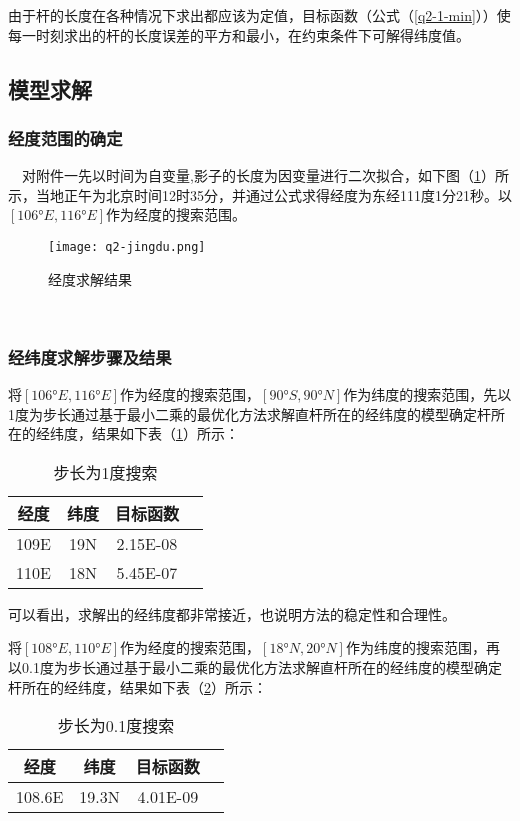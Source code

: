 \documentclass[withoutpreface,bwprint]{cumcmthesis} %
\begin{document}
\par 由于杆的长度在各种情况下求出都应该为定值，目标函数（公式（\ref{q2-1-min}））使每一时刻求出的杆的长度误差的平方和最小，在约束条件下可解得纬度值。

\subsection{模型求解}
\subsubsection{经度范围的确定}
　对附件一先以时间为自变量,影子的长度为因变量进行二次拟合，如下图（\ref{fig:q2-jingdu}）所示，当地正午为北京时间12时35分，并通过公式求得经度为东经111度1分21秒。以$[106°E, 116°E]$作为经度的搜索范围。

\begin{figure}[h]
\small
\centering
\texttt{[image: q2-jingdu.png]}
\caption{经度求解结果} \label{fig:q2-jingdu}
\end{figure}
　
\subsubsection{经纬度求解步骤及结果}
将$[106°E, 116°E]$作为经度的搜索范围，$[90°S, 90°N]$作为纬度的搜索范围，先以1度为步长通过基于最小二乘的最优化方法求解直杆所在的经纬度的模型确定杆所在的经纬度，结果如下表（\ref{步长为1度搜索}）所示：

\begin{table}[!htbp]
\centering
\caption{步长为1度搜索}
\label{步长为1度搜索}
\begin{tabular}{cccc}
\toprule
经度&纬度&目标函数\\
\midrule
109E & 19N & 2.15E-08 \\
110E & 18N & 5.45E-07 \\
\bottomrule 
\end{tabular}
\end{table}

\par 可以看出，求解出的经纬度都非常接近，也说明方法的稳定性和合理性。

\par 将$[108°E, 110°E]$作为经度的搜索范围，$[18°N, 20°N]$作为纬度的搜索范围，再以0.1度为步长通过基于最小二乘的最优化方法求解直杆所在的经纬度的模型确定杆所在的经纬度，结果如下表（\ref{步长为0.1度搜索}）所示：

\begin{table}[!htbp]
\centering
\caption{步长为0.1度搜索}
\label{步长为0.1度搜索}
\begin{tabular}{cccc}

\toprule
经度&纬度&目标函数\\
\midrule
108.6E&19.3N&4.01E-09\\
\bottomrule 
\end{tabular}
\end{table}
\end{document}
